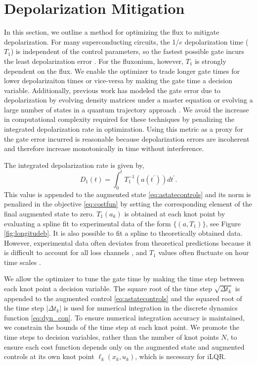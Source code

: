 \section{Depolarization Mitigation\label{sec:longitude}}
In this section, we outline a method
for optimizing the flux to mitigate depolarization.
For many superconducting circuits, the 1/$e$ depolarization time ($T_{1}$) is independent of the control parameters,
so the fastest possible gate incurs the least depolarization error
\cite{schulteherbruggen2011optimal}.
For the fluxonium, however, $T_{1}$ is strongly dependent on the flux.
We enable the optimizer to trade longer gate times
for lower depolarizaiton times or vice-versa by making the gate time a decision variable.
Additionally, previous work has modeled the gate error due to depolarization
by evolving density matrices under a master
equation \cite{rembold2020introduction, schulteherbruggen2011optimal}
or evolving a large number of states in a quantum trajectory approach
\cite{abdelhafez2019gradient}.
We avoid the increase in computational complexity required for these
techniques by penalizing the integrated depolarization rate in optimization.
Using this metric as a proxy for the gate error incurred
is reasonable because depolarization errors are incoherent and therefore
increase monotonically in time without interference.

The integrated depolarization rate is given by,
\begin{equation}
  D_{1}(t) = \int_{0}^{t} T_{1}^{-1}(a(t^{\prime})) dt^{\prime}.
\end{equation}
This value is appended to the augmented state \eqref{eq:astatecontrols}
and its norm is penalized in the objective \eqref{eq:costfun} by setting
the corresponding element of the final augmented state to zero.
$T_{1}(a_{k})$ is obtained at each knot point by evaluating
a spline fit to experimental data of the form $\{(a, T_{1})\}$,
see Figure \ref{fig:longitudeb}.
It is also possible to fit a spline to theoretically obtained data.
However, experimental data often deviates from theoretical predictions
because it is difficult to account for all loss channels \cite{zhang2020universal},
and $T_{1}$ values often fluctuate on hour
time scales \cite{klimov2018fluctuations}.

We allow the optimizer to tune the gate time by
making the time step between each knot point
a decision variable. 
The square root of the time step $\sqrt{\Delta t_{k}}$
is appended to the augmented control \eqref{eq:astatecontrols}
and the squared root
of the time step $\lvert \Delta t_{k} \rvert$ is used
for numerical integration in the discrete dynamics function \eqref{eq:dyn_con}.
To ensure numerical
integration accuracy is maintained, we constrain
the bounds of the time step at each knot point.
We promote the time steps
to decision variables, rather
than the number of knot points $N$, to ensure each cost function depends
only on the augmented state and augmented
controls at its own knot point $\ell_{k}(x_{k}, u_{k})$, which is necessary for iLQR.

